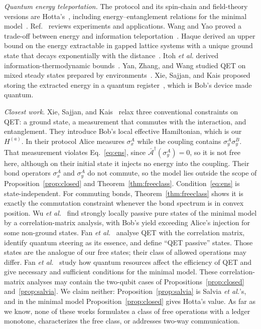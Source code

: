 \documentclass[aps,pra,twocolumn,reprint,superscriptaddress,nofootinbib,floatfix]{revtex4-2}
\theoremstyle{plain}
\theoremstyle{remark}
\newcommand{\Abar}{\bar{\mathcal{A}}}
\begin{document}
\emph{Quantum energy teleportation.} The protocol and its spin-chain and field-theory
versions are Hotta's~\cite{Hotta2008,Hotta2009,Hotta2011review}, including energy--entanglement
relations for the minimal model~\cite{Hotta2010}. Ref.~\cite{Ragula2025} reviews experiments
and applications. Wang and Yao proved a trade-off between energy and information
teleportation~\cite{Wang2024}. Haque derived an upper bound on the energy extractable in gapped lattice systems with a
unique ground state that decays exponentially with the distance~\cite{Haque2026}. Itoh \emph{et al.} derived
information-thermodynamic bounds~\cite{Itoh2026}. Yan, Zhang, and Wang studied QET on mixed
steady states prepared by environments~\cite{Yan2026}. Xie, Sajjan, and Kais proposed storing
the extracted energy in a quantum register~\cite{Xie2024}, which is Bob's device made
quantum.

\emph{Closest work.} Xie, Sajjan, and Kais~\cite{Xie2025} relax three conventional constraints
on QET: a ground state, a measurement that commutes with the interaction, and entanglement.
They introduce Bob's local effective Hamiltonian, which is our $H^{(a)}$. In their protocol
Alice measures $\sigma_x^A$ while the coupling contains $\sigma_y^A\sigma_y^B$. That
measurement violates Eq.~\eqref{eq:ens}, since $\Abar^\dagger(\sigma_y^A)=0$, so it is not free
here, although on their initial state it injects no energy into the coupling. Their bond
operators $\sigma_x^A$ and $\sigma_y^A$ do not commute, so the model lies outside the scope of
Proposition~\ref{prop:closed} and Theorem~\ref{thm:freeclass}. Condition~\eqref{eq:ens} is
state-independent. For commuting bonds, Theorem~\ref{thm:freeclass} shows it is exactly the
commutation constraint whenever the bond spectrum is in convex position. Wu \emph{et al.}~\cite{Wu2024}
find strongly locally passive pure states of the minimal model by a correlation-matrix
analysis, with Bob's yield exceeding Alice's injection for some non-ground states. Fan
\emph{et al.}~\cite{Fan2024steering} analyse QET with the correlation matrix, identify
quantum steering as its essence, and define ``QET passive'' states. Those states are the
analogue of our free states; their class of allowed operations may differ. Fan
\emph{et al.}~\cite{Fan2024resources} study how quantum resources affect the efficiency of QET
and give necessary and sufficient conditions for the minimal model. These correlation-matrix
analyses may contain the two-qubit cases of Propositions~\ref{prop:closed}
and~\ref{prop:salvia}. We claim neither: Proposition~\ref{prop:salvia} is Salvia
\emph{et al.}'s, and in the minimal model Proposition~\ref{prop:closed} gives Hotta's value.
As far as we know, none of these works formulates a class of free operations with a ledger
monotone, characterizes the free class, or addresses two-way communication.
\end{document}
